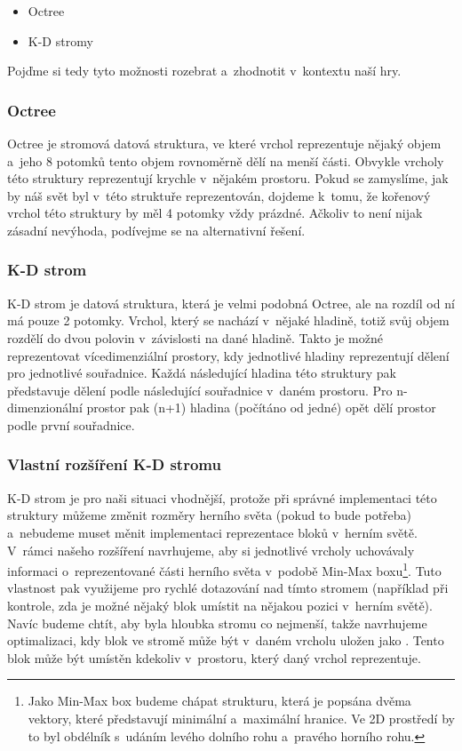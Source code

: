 \begin{itemize}
	\item Octree
	\item K-D stromy
\end{itemize}

Pojďme si tedy tyto možnosti rozebrat a~zhodnotit v~kontextu naší hry.

\subsubsection{Octree}
Octree je stromová datová struktura, ve které vrchol reprezentuje nějaký objem a~jeho 8 potomků tento objem rovnoměrně dělí na menší části. Obvykle vrcholy této struktury reprezentují krychle v~nějakém prostoru. Pokud se zamyslíme, jak by náš svět byl v~této struktuře reprezentován, dojdeme k~tomu, že kořenový vrchol této struktury by měl 4 potomky vždy prázdné. Ačkoliv to není nijak zásadní nevýhoda, podívejme se na alternativní řešení.

\subsubsection{K-D strom}
K-D strom je datová struktura, která je velmi podobná Octree, ale na rozdíl od ní má pouze 2 potomky. Vrchol, který se nachází v~nějaké hladině, totiž svůj objem rozdělí do dvou polovin v~závislosti na dané hladině. Takto je možné reprezentovat vícedimenziální prostory, kdy jednotlivé hladiny reprezentují dělení pro jednotlivé souřadnice. Každá následující hladina této struktury pak představuje dělení podle následující souřadnice v~daném prostoru. Pro n-dimenzionální prostor pak (n+1) hladina (počítáno od jedné) opět dělí prostor podle první souřadnice.

\subsubsection{Vlastní rozšíření K-D stromu}
K-D strom je pro naši situaci vhodnější, protože při správné implementaci této struktury můžeme změnit rozměry herního světa (pokud to bude potřeba) a~nebudeme muset měnit implementaci reprezentace bloků v~herním světě. V~rámci našeho rozšíření navrhujeme, aby si jednotlivé vrcholy uchovávaly informaci o~reprezentované části herního světa v~podobě Min-Max boxu\footnote{Jako Min-Max box budeme chápat strukturu, která je popsána dvěma vektory, které představují minimální a~maximální hranice. Ve 2D prostředí by to byl obdélník s~udáním levého dolního rohu a~pravého horního rohu.}. Tuto vlastnost pak využijeme pro rychlé dotazování nad tímto stromem (například při kontrole, zda je možné nějaký blok umístit na nějakou pozici v~herním světě). Navíc budeme chtít, aby byla hloubka stromu co nejmenší, takže navrhujeme optimalizaci, kdy blok ve stromě může být v~daném vrcholu uložen jako . Tento blok může být umístěn kdekoliv v~prostoru, který daný vrchol reprezentuje. 

